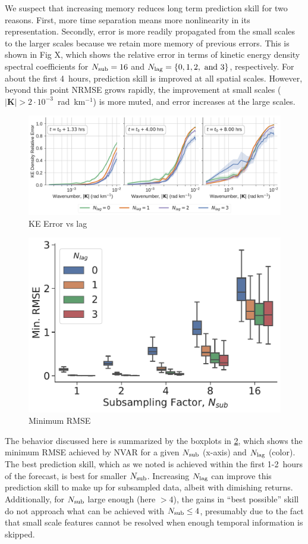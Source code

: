 We suspect that increasing memory reduces long term prediction skill for two
reasons.
First, more time separation means more nonlinearity in its representation.
Secondly, error is more readily propagated from the small scales to the larger
scales because we retain more memory of previous errors.
This is shown in Fig X,
which shows the relative error in terms of kinetic energy density spectral coefficients for $N_\text{sub}=16$ and
$N_\text{lag}=\{0, 1,2,\text{ and }3\}$, respectively.
For about the first 4~hours, prediction skill is improved at all spatial scales.
However, beyond this point
NRMSE grows rapidly, the improvement at
small scales ($|\mathbf{K}|>2\cdot10^{-3}$~rad~km$^{-1}$) is more muted,
and error increases at the large scales.

\begin{figure}
    \centering
    \includegraphics[width=\textwidth]{../figures/nvar_ke_relerr_vs_lag.pdf}
    \caption{KE Error vs lag}
    \label{fig:nvar_ke_vs_lag}
\end{figure}

\begin{figure}
    \centering
    \includegraphics[width=.5\textwidth]{../figures/nvar-mrmse-vs-lag-050samples.pdf}
    \caption{Minimum RMSE}
    \label{fig:nvar_min_rmse}
\end{figure}

The behavior discussed here is summarized by the boxplots in
\cref{fig:nvar_min_rmse}, which shows the minimum RMSE achieved by NVAR for a
given $N_\text{sub}$ (x-axis) and $N_\text{lag}$ (color).
The best prediction skill, which as we noted is achieved within the first
1-2~hours of the forecast, is best for smaller $N_\text{sub}$.
Increasing $N_\text{lag}$ can improve this prediction skill to make up for subsampled
data, albeit with dimishing returns.
Additionally, for $N_\text{sub}$ large enough
(here $>4$), the gains in ``best possible'' skill do not approach what can be
achieved with $N_\text{sub}\le 4$, presumably due to the fact that small scale features
cannot be resolved when enough temporal information is skipped.
